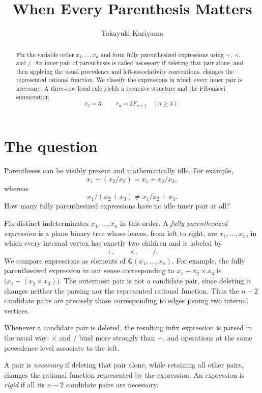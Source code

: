\documentclass[11pt]{article}
\title{When Every Parenthesis Matters}
\author{Takayuki Kuriyama}
\date{}
\newcommand{\Q}{\mathbb{Q}}
\begin{document}
\maketitle

\begin{abstract}
Fix the variable order $x_1,\ldots,x_n$ and form fully parenthesized
expressions using $+$, $\times$, and $/$. An inner pair of parentheses is
called necessary if deleting that pair alone, and then applying the usual
precedence and left-associativity conventions, changes the represented
rational function. We classify the expressions in which every inner pair is
necessary. A three-row local rule yields a recursive structure and the
Fibonacci enumeration
\[
 r_2=3,\qquad r_n=2F_{n+1}\quad(n\ge3).
\]
\end{abstract}

\section{The question}

Parentheses can be visibly present and mathematically idle. For example,
\[
 x_1+(x_2/x_3)=x_1+x_2/x_3,
\]
whereas
\[
 x_1/(x_2+x_3)\ne x_1/x_2+x_3.
\]
How many fully parenthesized expressions have no idle inner pair at all?

Fix distinct indeterminates $x_1,\ldots,x_n$ in this order. A
\emph{fully parenthesized expression} is a plane binary tree whose leaves,
from left to right, are $x_1,\ldots,x_n$, in which every internal vertex has
exactly two children and is labeled by
\[
 +,\qquad \times,\qquad /.
\]
We compare expressions as elements of $\Q(x_1,\ldots,x_n)$. For example, the
fully parenthesized expression in our sense corresponding to
$x_1+x_2\times x_3$ is $\bigl(x_1+(x_2\times x_3)\bigr)$. The outermost pair
is not a candidate pair, since deleting it changes neither the parsing nor the
represented rational function. Thus the $n-2$ candidate pairs are precisely
those corresponding to edges joining two internal vertices.

Whenever a candidate pair is deleted, the resulting infix expression is
parsed in the usual way: $\times$ and $/$ bind more strongly than $+$, and
operations at the same precedence level associate to the left.

A pair is \emph{necessary} if deleting that pair alone, while retaining all
other pairs, changes the rational function represented by the expression. An
expression is \emph{rigid} if all its $n-2$ candidate pairs are necessary.
\end{document}
